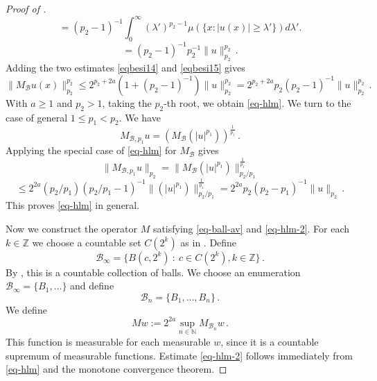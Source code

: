 \documentclass[10pt,a4paper]{article}
\theoremstyle{plain}
\theoremstyle{definition}
\numberwithin{equation}{subsection}
\begin{document}
\begin{proof}[Proof of ]
\begin{equation}
   =(p_2-1)^{-1}\int_0^\infty (\lambda')^{p_2-1}
     \mu (\{x: |u(x)|\ge \lambda'\})
d\lambda'.
\end{equation}
\begin{equation}\label{eqbesi15}
   =(p_2-1)^{-1} p_2^{-1}\|u\|_{p_2}^{p_2}\, .
\end{equation}
Adding the two estimates
\eqref{eqbesi14} and \eqref{eqbesi15} gives
\begin{equation}
    \|M_{\mathcal{B}}u(x)\|_{p_2}^{p_2}
   \le 2^{p_2+2a} (1+(p_2-1)^{-1})\|u\|_{p_2}^{p_2}
   = 2^{p_2+2a} p_2(p_2-1)^{-1}\|u\|_{p_2}^{p_2}
   \, .
   \end{equation}
With $a\ge 1$ and $p_2>1$, taking the $p_2$-th root, we obtain \eqref{eq-hlm}.
We turn to the case of general
$1\le p_1<p_2$.
We have
\begin{equation}
    M_{\mathcal{B},p_1}u=(M_{\mathcal{B}} (|u|^{p_1}))^{\frac 1{p_1}}\, .
\end{equation}
Applying the special case of \eqref{eq-hlm} for $M_{\mathcal{B}}$ gives
\begin{equation}
    \|M_{\mathcal{B},p_1}u\|_{p_2}=
    \|M_{\mathcal{B}} (|u|^{p_1})\|_{p_2/p_1}^{\frac 1{p_1}}
\end{equation}
\begin{equation}
    \le 2^{2a} (p_2/p_1) (p_2/p_1-1)^{-1}
    \|(|u|^{p_1})\|_{p_2/p_1}^{\frac 1{p_1}}
    =2^{2a} p_2(p_2-p_1)^{-1}\|u\|_{p_2}\, .
\end{equation}
This proves \eqref{eq-hlm} in general.

Now we construct the operator $M$ satisfying \eqref{eq-ball-av} and \eqref{eq-hlm-2}.
For each $k \in \mathbb{Z}$ we choose a countable set $C(2^k)$ as in .
Define
$$
    \mathcal{B}_\infty = \{B(c, 2^k) \ : \ c \in C(2^k), k \in \mathbb{Z}\}\,.
$$
By , this is a countable collection of balls. We choose an enumeration $\mathcal{B}_\infty = \{B_1, \dotsc\}$ and define
$$
    \mathcal{B}_n = \{B_1, \dotsc, B_n\}\,.
$$
We define
$$
    Mw := 2^{2a}\sup_{n \in \mathbb{N}} M_{\mathcal{B}_n}w\,.
$$
This function is measurable for each measurable $w$, since it is a countable supremum of measurable functions. Estimate \eqref{eq-hlm-2} follows immediately from \eqref{eq-hlm} and the monotone convergence theorem.


\end{proof}
\end{document}
